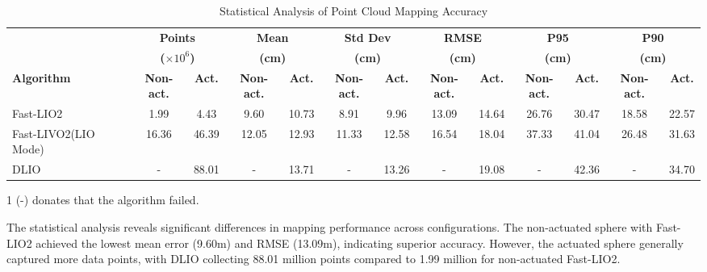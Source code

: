 \documentclass[conference]{IEEEtran}
\begin{document}
\begin{table}
\centering
\begin{threeparttable}
\caption{Statistical Analysis of Point Cloud Mapping Accuracy}
\label{tab:point_cloud_error}
\begin{tabular}{l|cc|cc|cc|cc|cc|cc}
\toprule
& \multicolumn{2}{c|}{\textbf{Points}} & \multicolumn{2}{c|}{\textbf{Mean}} & \multicolumn{2}{c|}{\textbf{Std Dev}} & \multicolumn{2}{c|}{\textbf{RMSE}} & \multicolumn{2}{c|}{\textbf{P95}} & \multicolumn{2}{c}{\textbf{P90}} \\
& \multicolumn{2}{c|}{\textbf{($\times 10^6$)}} & \multicolumn{2}{c|}{\textbf{(cm)}} & \multicolumn{2}{c|}{\textbf{(cm)}} & \multicolumn{2}{c|}{\textbf{(cm)}} & \multicolumn{2}{c|}{\textbf{(cm)}} & \multicolumn{2}{c}{\textbf{(cm)}} \\
\cmidrule(r){2-3} \cmidrule(lr){4-5} \cmidrule(lr){6-7} \cmidrule(lr){8-9} \cmidrule(l){10-11} \cmidrule(l){12-13}
\textbf{Algorithm} & \textbf{Non-act.} & \textbf{Act.} & \textbf{Non-act.} & \textbf{Act.} & \textbf{Non-act.} & \textbf{Act.} & \textbf{Non-act.} & \textbf{Act.} & \textbf{Non-act.} & \textbf{Act.} & \textbf{Non-act.} & \textbf{Act.} \\
\midrule
Fast-LIO2 & 1.99 & 4.43 & 9.60 & 10.73 & 8.91 & 9.96 & 13.09 & 14.64 & 26.76 & 30.47 & 18.58 & 22.57 \\
Fast-LIVO2(LIO Mode) & 16.36 & 46.39 & 12.05 & 12.93 & 11.33 & 12.58 & 16.54 & 18.04 & 37.33 & 41.04 & 26.48 & 31.63\\
DLIO & - & 88.01 & - & 13.71 & - & 13.26 & - & 19.08 & - & 42.36 & - & 34.70\\
\bottomrule
\end{tabular}
\begin{tablenotes}
    \item[1] (-) donates that the algorithm failed. %
\end{tablenotes}
\end{threeparttable}
\end{table}

The statistical analysis reveals significant differences in mapping performance across configurations. 
The non-actuated sphere with Fast-LIO2 achieved the lowest mean error (9.60m) and RMSE (13.09m), indicating superior accuracy. 
However, the actuated sphere generally captured more data points, with DLIO collecting 88.01 million points compared to 1.99 million for non-actuated Fast-LIO2. 
\end{document}
